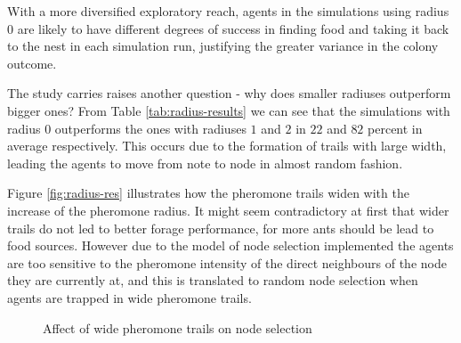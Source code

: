 With a more diversified exploratory reach, agents in the simulations using radius $0$ are likely to have different degrees of success in finding food and taking it back to the nest in each simulation run, justifying the greater variance in the colony outcome.

The study carries raises another question - why does smaller radiuses outperform bigger ones? From Table \ref{tab:radius-results} we can see that the simulations with radius $0$ outperforms the ones with radiuses $1$ and $2$ in $22$ and $82$ percent in average respectively. This occurs due to the formation of trails with large width, leading the agents to move from note to node in almost random fashion. 

Figure \ref{fig:radius-res} illustrates how the pheromone trails widen with the increase of the pheromone radius. It might seem contradictory at first that wider trails do not led to better forage performance, for more ants should be lead to food sources. However due to the model of node selection implemented the agents are too sensitive to the pheromone intensity of the direct neighbours of the node they are currently at, and this is translated to random node selection when agents are trapped in wide pheromone trails. 

\begin{figure}[H]
\myfloatalign
{} \quad
{}

\caption{Affect of wide pheromone trails on node selection}\label{fig:radius-saturation}
\end{figure}

